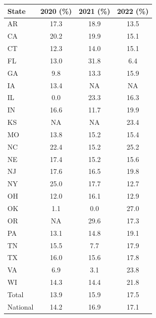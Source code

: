 \centering
\begin{tabular}{lccc}
\toprule
State & 2020 (\%) & 2021 (\%) & 2022 (\%) \\
\midrule
AR & 17.3 & 18.9 & 13.5 \\
CA & 20.2 & 19.9 & 15.1 \\
CT & 12.3 & 14.0 & 15.1 \\
FL & 13.0 & 31.8 & 6.4 \\
GA & 9.8 & 13.3 & 15.9 \\
IA & 13.4 & NA & NA \\
IL & 0.0 & 23.3 & 16.3 \\
IN & 16.6 & 11.7 & 19.9 \\
KS & NA & NA & 23.4 \\
MO & 13.8 & 15.2 & 15.4 \\
NC & 22.4 & 15.2 & 25.2 \\
NE & 17.4 & 15.2 & 15.6 \\
NJ & 17.6 & 16.5 & 19.8 \\
NY & 25.0 & 17.7 & 12.7 \\
OH & 12.0 & 16.1 & 12.9 \\
OK & 1.1 & 0.0 & 27.0 \\
OR & NA & 29.6 & 17.3 \\
PA & 13.1 & 14.8 & 19.1 \\
TN & 15.5 & 7.7 & 17.9 \\
TX & 16.0 & 15.6 & 17.8 \\
VA & 6.9 & 3.1 & 23.8 \\
WI & 14.3 & 14.4 & 21.8 \\
\midrule
Total & 13.9 & 15.9 & 17.5 \\
National & 14.2 & 16.9 & 17.1 \\
\bottomrule
\end{tabular}
\label{tab:turnover_rates}


